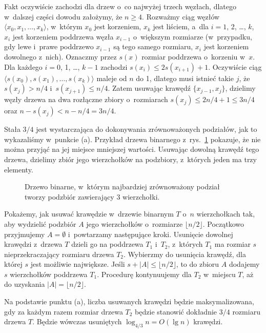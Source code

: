 
\subproblem %
Fakt oczywiście zachodzi dla drzew o~co najwyżej trzech węzłach, dlatego w~dalszej części dowodu założymy, że $n\ge4$.
Rozważmy ciąg węzłów $\langle x_0,x_1,\dots,x_k\rangle$, w~którym $x_0$ jest korzeniem, $x_k$ jest liściem, a~dla $i=1$, 2, \dots, $k$, $x_i$ jest korzeniem poddrzewa węzła $x_{i-1}$ o~większym rozmiarze (w~przypadku, gdy lewe i~prawe poddrzewo $x_{i-1}$ są tego samego rozmiaru, $x_i$ jest korzeniem dowolnego z~nich).
Oznaczmy przez $s(x)$ rozmiar poddrzewa o~korzeniu w~$x$.
Dla każdego $i=0$, 1, \dots, $k-1$ zachodzi $s(x_i)\le2s(x_{i+1})+1$.
Oczywiście ciąg $\langle s(x_0),s(x_1),\dots,s(x_k)\rangle$ maleje od $n$ do 1, dlatego musi istnieć takie $j$, że $s(x_j)>n/4$ i~$s(x_{j+1})\le n/4$.
Zatem usuwając krawędź $\{x_{j-1},x_j\}$, dzielimy węzły drzewa na dwa rozłączne zbiory o~rozmiarach $s(x_j)\le2n/4+1\le3n/4$ oraz $n-s(x_j)<n-n/4=3n/4$.

\subproblem %
Stała $3/4$ jest wystarczająca do dokonywania zrównoważonych podziałów, jak to wykazaliśmy w~punkcie (a).
Przykład drzewa binarnego z~rys.\ \ref{fig:B-3b} pokazuje, że nie można przyjąć na jej miejsce mniejszej wartości.
Usuwając dowolną krawędź tego drzewa, dzielimy zbiór jego wierzchołków na podzbiory, z~których jeden ma trzy elementy.
\begin{figure}[!ht]
	\centering 
	\caption{Drzewo binarne, w~którym najbardziej zrównoważony podział tworzy podzbiór zawierający 3 wierzchołki.} \label{fig:B-3b}
\end{figure}

\subproblem %
Pokażemy, jak usuwać krawędzie w~drzewie binarnym $T$ o~$n$ wierzchołkach tak, aby wydzielić podzbiór $A$ jego wierzchołków o~rozmiarze $\lfloor n/2\rfloor$.
Początkowo przyjmujemy $A=\emptyset$ i~powtarzamy następujące kroki.
Usunięcie dowolnej krawędzi z~drzewa $T$ dzieli go na poddrzewa $T_1$ i~$T_2$, z~których $T_1$ ma rozmiar $s$ nieprzekraczający rozmiaru drzewa $T_2$.
Wybierzmy do usunięcia krawędź, dla której $s$ jest możliwie największe.
Jeśli $s+|A|\le\lfloor n/2\rfloor$, to do zbioru $A$ dodajemy $s$ wierzchołków poddrzewa $T_1$.
Procedurę kontynuujemy dla $T_2$ w~miejscu $T$, aż do uzyskania $|A|=\lfloor n/2\rfloor$.

Na podstawie punktu (a), liczba usuwanych krawędzi będzie maksymalizowana, gdy za każdym razem rozmiar drzewa $T_2$ będzie stanowić dokładnie $3/4$ rozmiaru drzewa $T$.
Będzie wówczas usuniętych $\log_{4/3}n=O(\lg n)$ krawędzi.
